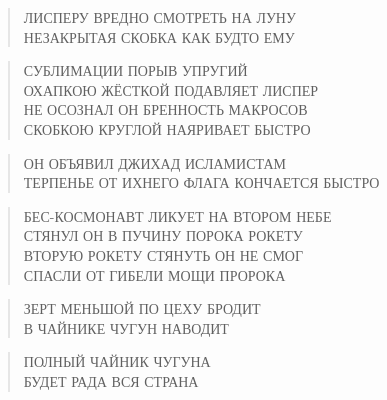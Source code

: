 \poemtitle{***}
\begin{verse}
ЛИСПЕРУ ВРЕДНО СМОТРЕТЬ НА ЛУНУ\\
НЕЗАКРЫТАЯ СКОБКА КАК БУДТО ЕМУ
\end{verse}

\poemtitle{***}
\begin{verse}
СУБЛИМАЦИИ ПОРЫВ УПРУГИЙ\\
ОХАПКОЮ ЖЁСТКОЙ ПОДАВЛЯЕТ ЛИСПЕР\\
НЕ ОСОЗНАЛ ОН БРЕННОСТЬ МАКРОСОВ\\
СКОБКОЮ КРУГЛОЙ НАЯРИВАЕТ БЫСТРО
\end{verse}

\poemtitle{***}
\begin{verse}
ОН ОБЪЯВИЛ ДЖИХАД ИСЛАМИСТАМ\\
ТЕРПЕНЬЕ ОТ ИХНЕГО ФЛАГА КОНЧАЕТСЯ БЫСТРО
\end{verse}

\poemtitle{***}
\begin{verse}
БЕС-КОСМОНАВТ ЛИКУЕТ НА ВТОРОМ НЕБЕ\\
СТЯНУЛ ОН В ПУЧИНУ ПОРОКА РОКЕТУ\\
ВТОРУЮ РОКЕТУ СТЯНУТЬ ОН НЕ СМОГ\\
СПАСЛИ ОТ ГИБЕЛИ МОЩИ ПРОРОКА
\end{verse}

\poemtitle{***}
\begin{verse}
ЗЕРТ МЕНЬШОЙ ПО ЦЕХУ БРОДИТ\\
В ЧАЙНИКЕ ЧУГУН НАВОДИТ
\end{verse}

\poemtitle{***}
\begin{verse}
ПОЛНЫЙ ЧАЙНИК ЧУГУНА\\
БУДЕТ РАДА ВСЯ СТРАНА
\end{verse}


